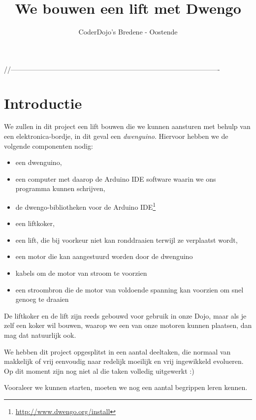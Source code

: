 \documentclass[a4paper, 10pt]{article}
\begin{document}
\title{We bouwen een lift met Dwengo}
\author{CoderDojo's Bredene - Oostende}
\maketitle

//-------------------------------------------------------------------------------------------
\section{Introductie}

We zullen in dit project een lift bouwen die we kunnen aansturen met behulp van een elektronica-bordje, in dit
geval een {\em dwenguino}. Hiervoor hebben we de volgende componenten nodig:

\begin{itemize}
\item een dwenguino,
\item een computer met daarop de Arduino IDE software waarin we ons programma kunnen schrijven,
\item de dwengo-bibliotheken voor de Arduino IDE\footnote{\url{http://www.dwengo.org/install}}
\item een liftkoker,
\item een lift, die bij voorkeur niet kan ronddraaien terwijl ze verplaatst wordt,
\item een motor die kan aangestuurd worden door de dwenguino
\item kabels om de motor van stroom te voorzien
\item een stroombron die de motor van voldoende spanning kan voorzien om snel genoeg te draaien
\end{itemize}

De liftkoker en de lift zijn reeds gebouwd voor gebruik in onze Dojo, maar als je zelf een koker wil bouwen, waarop
we een van onze motoren kunnen plaatsen, dan mag dat natuurlijk ook.

We hebben dit project opgesplitst in een aantal deeltaken, die normaal van makkelijk of vrij eenvoudig naar redelijk
moeilijk en vrij ingewikkeld evolueren. Op dit moment zijn nog niet al die taken volledig uitgewerkt :)

Vooraleer we kunnen starten, moeten we nog een aantal begrippen leren kennen.
\end{document}
